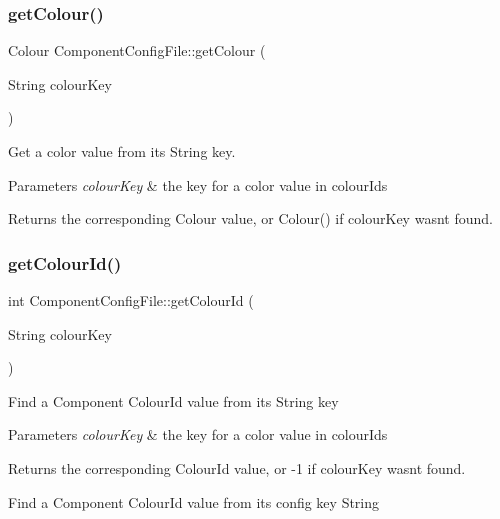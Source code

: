\subsubsection{\texorpdfstring{get\+Colour()}{getColour()}\hspace{0.1cm}{\footnotesize\ttfamily [2/2]}}
{\footnotesize\ttfamily Colour Component\+Config\+File\+::get\+Colour (\begin{DoxyParamCaption}\item[{String}]{colour\+Key }\end{DoxyParamCaption})}

Get a color value from its String key.


\begin{DoxyParams}{Parameters}
{\em colour\+Key} & the key for a color value in colour\+Ids \\
\hline
\end{DoxyParams}
\begin{DoxyReturn}{Returns}
the corresponding Colour value, or Colour() if colour\+Key wasn\textquotesingle{}t found. 
\end{DoxyReturn}
\mbox{\label{classComponentConfigFile_aa87c850a6381399fcbf9242522c9a65a}} 
\subsubsection{\texorpdfstring{get\+Colour\+Id()}{getColourId()}}
{\footnotesize\ttfamily int Component\+Config\+File\+::get\+Colour\+Id (\begin{DoxyParamCaption}\item[{String}]{colour\+Key }\end{DoxyParamCaption})}

Find a Component Colour\+Id value from its String key


\begin{DoxyParams}{Parameters}
{\em colour\+Key} & the key for a color value in colour\+Ids \\
\hline
\end{DoxyParams}
\begin{DoxyReturn}{Returns}
the corresponding Colour\+Id value, or -\/1 if colour\+Key wasn\textquotesingle{}t found.
\end{DoxyReturn}
Find a Component Colour\+Id value from its config key String \mbox{\label{classComponentConfigFile_ae2d37902d4153dd9b8f31418955c991f}} 
